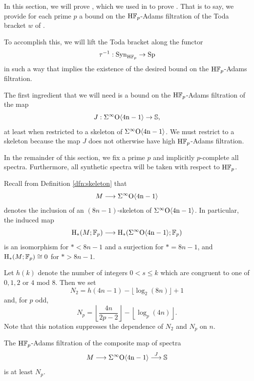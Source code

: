 In this section, we will prove , which we used in  to prove . That is to say, we provide for each prime $p$ a bound on the $\mathrm{H}\mathbb{F}_p$-Adams filtration of the Toda bracket $w$ of .

To accomplish this, we will lift the Toda bracket along the functor \[ \tau^{-1} : \mathrm{Syn}_{\mathrm{H}\mathbb{F}_p} \to \operatorname{\mathrm{Sp}}\] in such a way that  implies the existence of the desired bound on the $\mathrm{H}\mathbb{F}_p$-Adams filtration.

The first ingredient that we will need is a bound on the $\mathrm{H}\mathbb{F}_p$-Adams filtration of the map \[J : \Sigma^{\infty} \mathrm{O}\mathrm{\langle4n-1 \rangle} \to \operatorname{\mathbb{S}},\] at least when restricted to a skeleton of $\Sigma^{\infty} \mathrm{O}\mathrm{\langle 4n-1 \rangle}$. We must restrict to a skeleton because the map $J$ does not otherwise have high $\mathrm{H}\mathbb{F}_p$-Adams filtration.

\begin{cnv}
In the remainder of this section, we fix a prime $p$ and implicitly $p$-complete all spectra. Furthermore, all synthetic spectra will be taken with respect to $\mathrm{H}\mathbb{F}_p$.
\end{cnv}

\begin{rmk}
 Recall from Definition \ref{dfn:skeleton} that
	$$M \longrightarrow \Sigma^{\infty} \mathrm{O} \mathrm{\langle 4n-1 \rangle}$$
	denotes the inclusion of an $(8n-1)$-skeleton of $\Sigma^{\infty} \mathrm{O} \mathrm{\langle 4n-1 \rangle}$. In particular, the induced map
	$$\mathrm{H}_*(M;\operatorname{\mathbb{F}}_p) \longrightarrow \mathrm{H}_*(\Sigma^{\infty} \mathrm{O} \mathrm{\langle 4n-1 \rangle};\operatorname{\mathbb{F}}_p)$$
is an isomorphism for $* < 8n-1$ and a surjection for $* = 8n-1$, and $\mathrm{H}_*(M;\operatorname{\mathbb{F}}_p) \cong 0$ for $* > 8n-1$.
\end{rmk}

\begin{ntn}
    Let $h(k)$ denote the number of integers $0 < s \leq k$ which are congruent to one of $0,1,2$ or $4$ mod $8$. Then we set \[N_2 = h(4n-1) - \lfloor \log_2 (8n) \rfloor + 1\] and, for $p$ odd, \[N_p = \left\lfloor \frac{4n}{2p-2} \right\rfloor - \left\lfloor \log_p (4n) \right\rfloor.\] Note that this notation suppresses the dependence of $N_2$ and $N_p$ on $n$.
\end{ntn}

\begin{lem}\label{lemm:filtration}
The $\mathrm{H}\mathbb{F}_p$-Adams filtration of the composite map of spectra
	$$M \longrightarrow \Sigma^{\infty} \mathrm{O} \mathrm{\langle 4n-1 \rangle} \stackrel{J}{\longrightarrow} \mathbb{S}$$
	is at least $N_p$.
\end{lem}

